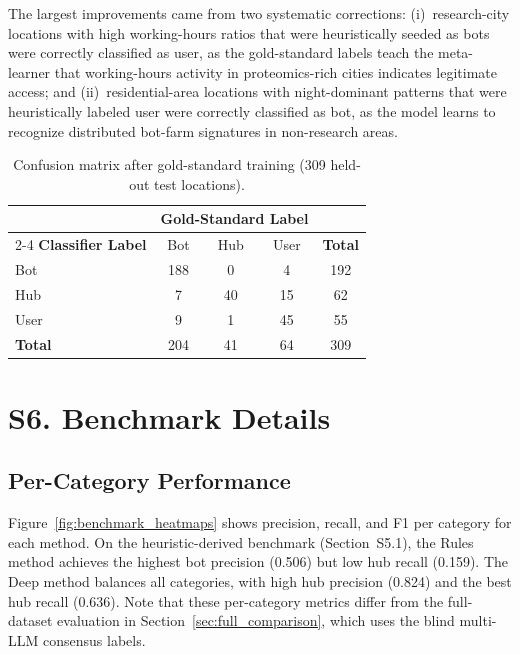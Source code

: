 \documentclass[11pt,a4paper]{article}
\begin{document}
The largest improvements came from two systematic corrections: (i)~research-city locations with high working-hours ratios that were heuristically seeded as bots were correctly classified as user, as the gold-standard labels teach the meta-learner that working-hours activity in proteomics-rich cities indicates legitimate access; and (ii)~residential-area locations with night-dominant patterns that were heuristically labeled user were correctly classified as bot, as the model learns to recognize distributed bot-farm signatures in non-research areas.

\begin{table}[H]
\centering
\caption{Confusion matrix after gold-standard training (309 held-out test locations).}
\label{tab:retrained_confusion}
\small
\begin{tabular}{lcccc}
\toprule
& \multicolumn{3}{c}{\textbf{Gold-Standard Label}} & \\
\cmidrule{2-4}
\textbf{Classifier Label} & Bot & Hub & User & \textbf{Total} \\
\midrule
Bot & 188 & 0 & 4 & 192 \\
Hub & 7 & 40 & 15 & 62 \\
User & 9 & 1 & 45 & 55 \\
\midrule
\textbf{Total} & 204 & 41 & 64 & 309 \\
\bottomrule
\end{tabular}
\end{table}

\section{S6. Benchmark Details}
\label{sec:benchmark}

\subsection{Per-Category Performance}

Figure~\ref{fig:benchmark_heatmaps} shows precision, recall, and F1 per category for each method. On the heuristic-derived benchmark (Section~S5.1), the Rules method achieves the highest bot precision (0.506) but low hub recall (0.159). The Deep method balances all categories, with high hub precision (0.824) and the best hub recall (0.636). Note that these per-category metrics differ from the full-dataset evaluation in Section~\ref{sec:full_comparison}, which uses the blind multi-LLM consensus labels.
\end{document}
